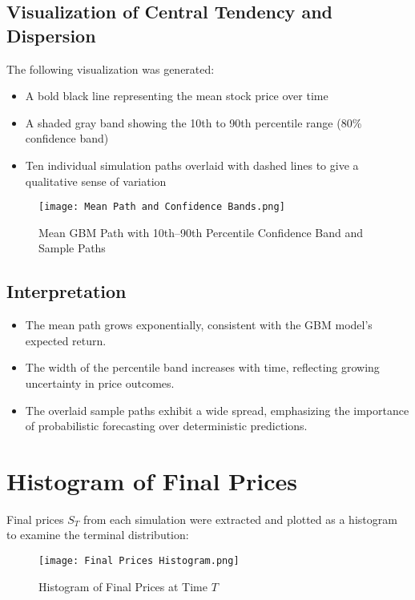 \documentclass[12pt]{article}
\begin{document}
\subsection*{Visualization of Central Tendency and Dispersion}
The following visualization was generated:
\begin{itemize}
    \item A bold black line representing the mean stock price over time
    \item A shaded gray band showing the 10th to 90th percentile range (80\% confidence band)
    \item Ten individual simulation paths overlaid with dashed lines to give a qualitative sense of variation
\end{itemize}

\begin{figure}[H]
    \centering
    \texttt{[image: Mean Path and Confidence Bands.png]}
    \caption{Mean GBM Path with 10th–90th Percentile Confidence Band and Sample Paths}
\end{figure}

\subsection*{Interpretation}
\begin{itemize}
    \item The mean path grows exponentially, consistent with the GBM model's expected return.
    \item The width of the percentile band increases with time, reflecting growing uncertainty in price outcomes.
    \item The overlaid sample paths exhibit a wide spread, emphasizing the importance of probabilistic forecasting over deterministic predictions.
\end{itemize}





\section{Histogram of Final Prices}
Final prices \( S_T \) from each simulation were extracted and plotted as a histogram to examine the terminal distribution:

\begin{figure}[H]
    \centering
    \texttt{[image: Final Prices Histogram.png]}
    \caption{Histogram of Final Prices at Time \( T \)}
\end{figure}
\end{document}
